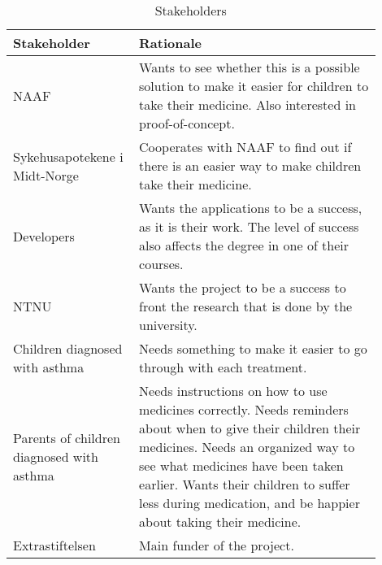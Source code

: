 \begin{table}
	\begin{center}
		\begin{tabular}{|p{0.3\linewidth}|p{0.6\linewidth}|}   
			\hline      
			\bf{Stakeholder} & \bf{Rationale} \\ 
			\hline
			NAAF & Wants to see whether this is a possible solution to make it easier for children to take their medicine. Also interested in proof-of-concept.
			\\
			\hline
			Sykehusapotekene i Midt-Norge & Cooperates with NAAF to find out if there is an easier
			way to make children take their medicine. 
			\\
			\hline
			Developers & Wants the applications to be a success, as it is their work. The level of success also affects the degree in one of their courses.
			\\
			\hline
			NTNU & Wants the project to be a success to front the research that is done by
			the university.
			\\
			\hline
			Children diagnosed with asthma & Needs something to make it easier to go through
			with each treatment.
			\\
			\hline
			Parents of children diagnosed with asthma & Needs instructions on how to use
			medicines correctly. Needs reminders about when to give their children their medicines. Needs an
			organized way to see what medicines have been taken earlier. Wants their children to
			suffer less during medication, and be happier about taking their medicine.
			\\
			\hline 
			Extrastiftelsen & Main funder of the project. 
			\\
			\hline
		\end{tabular}
	\end{center}
	\caption{Stakeholders}
	\label{tab:stakeholders}
\end{table}